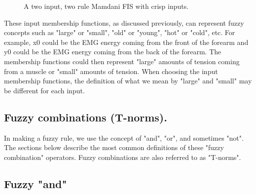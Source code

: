 \begin{figure}
\captionsetup{justification=centering,margin=2cm}
\centering
\setlength\fboxsep{0pt}
\setlength\fboxrule{0.7pt}
\caption{A two input, two rule Mamdani FIS with crisp inputs.}
\label{fig:mamdaniFis}       
\end{figure}

These input membership functions, as discussed previously, can represent fuzzy concepts 
such as "large" or "small", "old" or "young", "hot" or "cold", etc. For example, x0
could be the EMG energy coming from the front of the forearm and y0 could be the
EMG energy coming from the back of the forearm. The membership functions could
then represent "large" amounts of tension coming from a muscle or "small"
amounts of tension. When choosing the input membership functions, the definition
of what we mean by "large" and "small" may be different for each input.

\subsection{Fuzzy combinations (T-norms).} 
In making a fuzzy rule, we use the concept of "and", "or", and sometimes "not". 
The sections below describe the most common definitions of these 
"fuzzy combination" operators. Fuzzy combinations are also referred to as "T-norms".

\subsection{Fuzzy "and"}


